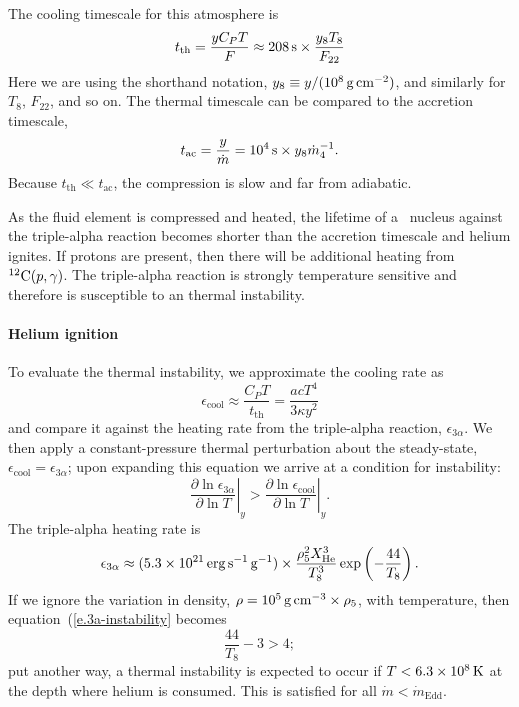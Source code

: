 The cooling timescale for this atmosphere is
\[ t_{\mathrm{th}} = \frac{yC_{P} T}{F} \approx 208\,\mathrm{s} \times \frac{y_{8} T_{8}}{F_{22}} \]
Here we are using the shorthand notation, $y_{8}\equiv y/(10^{8}\,\mathrm{g}\,{\mathrm{c}\mathrm{m}}^{-2})$, and similarly for $T_{8}$, $F_{22}$, and so on.
The thermal timescale can be compared to the accretion timescale,
\[ t_{\mathrm{ac}} = \frac{y}{\dot{m}} = 10^{4}\,\mathrm{s}\times y_{8}\dot{m}_{4}^{-1}.
\]
Because $t_{\mathrm{th}}\ll t_{\mathrm{ac}}$, the compression is slow and far from adiabatic.

As the fluid element is compressed and heated, the lifetime of a \helium\ nucleus against the triple-alpha reaction becomes shorter than the accretion timescale and helium ignites.  If protons are present, then there will be additional heating from $\mathrm{^{12}C}(p,\gamma)$.  The triple-alpha reaction is strongly temperature sensitive and therefore is susceptible to an thermal instability.

\paragraph{Helium ignition}
To evaluate the thermal instability, we approximate the cooling rate as
\begin{equation}\label{e.cooling-rate-approx}
\epsilon_{\mathrm{cool}} \approx \frac{C_{P}T}{t_{\mathrm{th}}} = \frac{ac T^{4}}{3\kappa y^{2}}
\end{equation}
and compare it against the heating rate from the triple-alpha reaction, $\epsilon_{3\alpha}$. We then apply a constant-pressure thermal perturbation about the steady-state, $\epsilon_{\mathrm{cool}} = \epsilon_{3\alpha}$; upon expanding this equation we arrive at a condition for instability:
\begin{equation}\label{e.3a-instability}
\left.\frac{\partial\ln\epsilon_{3\alpha}}{\partial\ln T}\right|_{y} > \left.\frac{\partial\ln\epsilon_{\mathrm{cool}}}{\partial\ln T}\right|_{y}.
\end{equation}
The triple-alpha heating rate is 
\[
	\epsilon_{3\alpha} \approx (5.3\times 10^{21}\,\mathrm{erg}\,{\mathrm{s}}^{-1}\,\mathrm{g}^{-1}) \times \frac{\rho_{5}^{2}X_{\mathrm{He}}^{3}}{T_{8}^{3}}\exp\left(-\frac{44}{T_{8}}\right).
\]
If we ignore the variation in density, $\rho = 10^{5}\,\mathrm{g}\,{\mathrm{c}\mathrm{m}}^{-3} \times \rho_{5}$, with temperature, then equation~(\ref{e.3a-instability} becomes
\begin{equation}\label{e.3a-instability-temperature}
\frac{44}{T_{8}} - 3 > 4;
\end{equation}
put another way, a thermal instability is expected to occur if $T < 6.3\times 10^{8}\,\mathrm{K}$ at the depth where helium is consumed.  This is satisfied for all $\dot{m}< \dot{m}_{\mathrm{Edd}}$.

